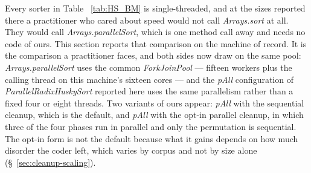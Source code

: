 \documentclass[twoside,leqno,twocolumn]{article}
\begin{document}
Every sorter in Table ~\ref{tab:HS_BM} is single-threaded, and at the sizes reported there a
practitioner who cared about speed would not call \textit{Arrays.sort} at all.
They would call \mbox{\textit{Arrays.parallelSort}}, which is one method call away and needs no code of
ours.
This section reports that comparison on the machine of record.
It is the comparison a practitioner faces, and both sides now draw on the same pool:
\mbox{\textit{Arrays.parallelSort}} uses the common \textit{ForkJoinPool} --- fifteen workers plus the
calling thread on this machine's sixteen cores --- and the \textit{pAll} configuration of
\textit{ParallelRadixHuskySort} reported here uses the same parallelism rather than a fixed four or
eight threads.
Two variants of ours appear: \textit{pAll} with the sequential cleanup, which is the default, and
\textit{pAll} with the opt-in parallel cleanup, in which three of the four phases run in parallel and
only the permutation is sequential.
The opt-in form is not the default because what it gains depends on how much disorder the coder left,
which varies by corpus and not by size alone (\S~\ref{sec:cleanup-scaling}).
\end{document}
